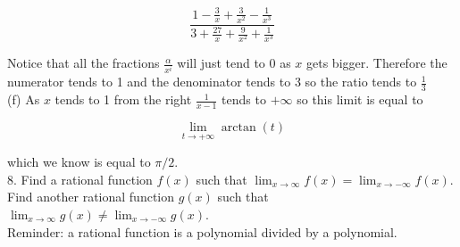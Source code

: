 \documentclass[10pt]{article}
\begin{document}
$$
\frac{1-\frac{3}{x}+\frac{3}{x^{2}}-\frac{1}{x^{3}}}{3+\frac{27}{x}+\frac{9}{x^{2}}+\frac{1}{x^{3}}}
$$

Notice that all the fractions $\frac{\alpha}{x^{i}}$ will just tend to 0 as $x$ gets bigger. Therefore the numerator tends to 1 and the denominator tends to 3 so the ratio tends to $\frac{1}{3}$\\
(f) As $x$ tends to 1 from the right $\frac{1}{x-1}$ tends to $+\infty$ so this limit is equal to

$$
\lim _{t \rightarrow+\infty} \arctan (t)
$$

which we know is equal to $\pi / 2$.\\
8. Find a rational function $f(x)$ such that $\lim _{x \rightarrow \infty} f(x)=\lim _{x \rightarrow-\infty} f(x)$. Find another rational function $g(x)$ such that $\lim _{x \rightarrow \infty} g(x) \neq \lim _{x \rightarrow-\infty} g(x)$.\\
Reminder: a rational function is a polynomial divided by a polynomial.
\end{document}
